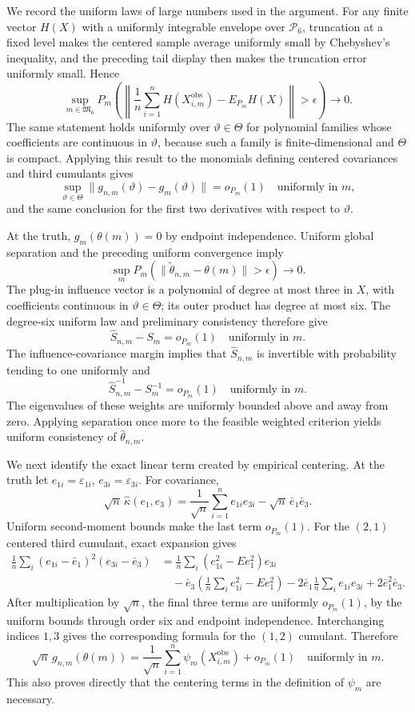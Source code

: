 We record the uniform laws of large numbers used in the argument. For any finite vector \(H(X)\) with a uniformly integrable envelope over \(\mathcal P_6\), truncation at a fixed level makes the centered sample average uniformly small by Chebyshev's inequality, and the preceding tail display then makes the truncation error uniformly small. Hence
\[
\sup_{m\in\mathfrak M_6}
P_m\!\left(\left\|\frac1n\sum_{i=1}^nH(X_{i,m}^{\mathrm{obs}})-E_{P_m}H(X)\right\|>\epsilon\right)\to0.
\]
The same statement holds uniformly over \(\vartheta\in\Theta\) for polynomial families whose coefficients are continuous in \(\vartheta\), because such a family is finite-dimensional and \(\Theta\) is compact. Applying this result to the monomials defining centered covariances and third cumulants gives
\[
\sup_{\vartheta\in\Theta}\|g_{n,m}(\vartheta)-g_m(\vartheta)\|=o_{P_m}(1)
\quad\text{uniformly in }m,
\]
and the same conclusion for the first two derivatives with respect to \(\vartheta\).

At the truth, \(g_m(\theta(m))=0\) by endpoint independence. Uniform global separation and the preceding uniform convergence imply
\[
\sup_mP_m(\|\widetilde\theta_{n,m}-\theta(m)\|>\epsilon)\to0.
\]
The plug-in influence vector is a polynomial of degree at most three in \(X\), with coefficients continuous in \(\vartheta\in\Theta\); its outer product has degree at most six. The degree-six uniform law and preliminary consistency therefore give
\[
\widehat S_{n,m}-S_m=o_{P_m}(1)
\quad\text{uniformly in }m.
\]
The influence-covariance margin implies that \(\widehat S_{n,m}\) is invertible with probability tending to one uniformly and
\[
\widehat S_{n,m}^{-1}-S_m^{-1}=o_{P_m}(1)
\quad\text{uniformly in }m.
\]
The eigenvalues of these weights are uniformly bounded above and away from zero. Applying separation once more to the feasible weighted criterion yields uniform consistency of \(\widehat\theta_{n,m}\).

We next identify the exact linear term created by empirical centering. At the truth let \(e_{1i}=\varepsilon_{1i}\), \(e_{3i}=\varepsilon_{3i}\). For covariance,
\[
\sqrt n\,\widehat\kappa(e_1,e_3)
=\frac1{\sqrt n}\sum_{i=1}^ne_{1i}e_{3i}
-\sqrt n\,\bar e_1\bar e_3.
\]
Uniform second-moment bounds make the last term \(o_{P_m}(1)\). For the \((2,1)\) centered third cumulant, exact expansion gives
\[
\begin{aligned}
\frac1n\sum_i(e_{1i}-\bar e_1)^2(e_{3i}-\bar e_3)
&=\frac1n\sum_i(e_{1i}^2-Ee_1^2)e_{3i}\\
&\quad-\bar e_3\left(\frac1n\sum_ie_{1i}^2-Ee_1^2\right)
-2\bar e_1\frac1n\sum_ie_{1i}e_{3i}
+2\bar e_1^2\bar e_3.
\end{aligned}
\]
After multiplication by \(\sqrt n\), the final three terms are uniformly \(o_{P_m}(1)\), by the uniform bounds through order six and endpoint independence. Interchanging indices \(1,3\) gives the corresponding formula for the \((1,2)\) cumulant. Therefore
\[
\sqrt n\,g_{n,m}(\theta(m))
=\frac1{\sqrt n}\sum_{i=1}^n\psi_m(X_{i,m}^{\mathrm{obs}})+o_{P_m}(1)
\quad\text{uniformly in }m.
\]
This also proves directly that the centering terms in the definition of \(\psi_m\) are necessary.

